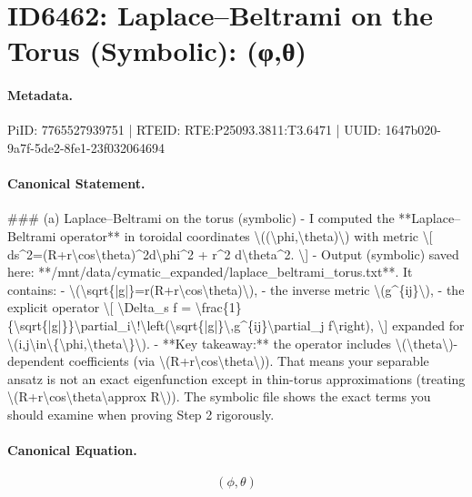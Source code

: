 \section*{ID6462: Laplace–Beltrami on the Torus (Symbolic): (φ,θ)}
\paragraph{Metadata.}
PiID: 7765527939751 | RTEID: RTE:P25093.3811:T3.6471 | UUID: 1647b020-9a7f-5de2-8fe1-23f032064694

\paragraph{Canonical Statement.}
\#\#\# (a) Laplace–Beltrami on the torus (symbolic) - I computed the **Laplace–Beltrami operator** in toroidal coordinates \textbackslash{}((\textbackslash{}phi,\textbackslash{}theta)\textbackslash{}) with metric \textbackslash{}[ ds\textasciicircum{}2=(R+r\textbackslash{}cos\textbackslash{}theta)\textasciicircum{}2d\textbackslash{}phi\textasciicircum{}2 + r\textasciicircum{}2 d\textbackslash{}theta\textasciicircum{}2. \textbackslash{}] - Output (symbolic) saved here: **/mnt/data/cymatic\_expanded/laplace\_beltrami\_torus.txt**. It contains: - \textbackslash{}(\textbackslash{}sqrt\{|g|\}=r(R+r\textbackslash{}cos\textbackslash{}theta)\textbackslash{}), - the inverse metric \textbackslash{}(g\textasciicircum{}\{ij\}\textbackslash{}), - the explicit operator \textbackslash{}[ \textbackslash{}Delta\_s f = \textbackslash{}frac\{1\}\{\textbackslash{}sqrt\{|g|\}\}\textbackslash{}partial\_i\textbackslash{}!\textbackslash{}left(\textbackslash{}sqrt\{|g|\}\textbackslash{},g\textasciicircum{}\{ij\}\textbackslash{}partial\_j f\textbackslash{}right), \textbackslash{}] expanded for \textbackslash{}(i,j\textbackslash{}in\textbackslash{}\{\textbackslash{}phi,\textbackslash{}theta\textbackslash{}\}\textbackslash{}). - **Key takeaway:** the operator includes \textbackslash{}(\textbackslash{}theta\textbackslash{})-dependent coefficients (via \textbackslash{}(R+r\textbackslash{}cos\textbackslash{}theta\textbackslash{})). That means your separable ansatz is not an exact eigenfunction except in thin-torus approximations (treating \textbackslash{}(R+r\textbackslash{}cos\textbackslash{}theta\textbackslash{}approx R\textbackslash{})). The symbolic file shows the exact terms you should examine when proving Step 2 rigorously.

\paragraph{Canonical Equation.}
\[
(\phi,\theta)
\]

